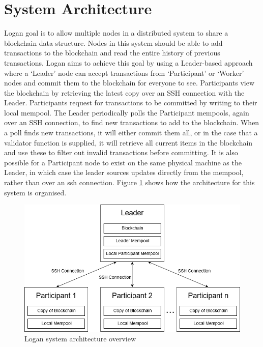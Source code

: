 \documentclass[12pt,a4paper,twoside,openright]{report}
\begin{document}
	\section{System Architecture}\label{sec:sysarch}
	Logan goal is to allow multiple nodes in a distributed system to share a blockchain data structure.
	Nodes in this system should be able to add transactions to the blockchain and read the entire history of previous transactions.
	Logan aims to achieve this goal by using a Leader-based approach where a `Leader' node can accept transactions from `Participant' or `Worker' nodes and commit them to the blockchain for everyone to see.
	Participants view the blockchain by retrieving the latest copy over an SSH connection with the Leader.
	Participants request for transactions to be committed by writing to their local mempool. 
	The Leader periodically polls the Participant mempools, again over an SSH connection, to find new transactions to add to the blockchain.
	When a poll finds new transactions, it will either commit them all, or in the case that a validator function is supplied, it will retrieve all current items in the blockchain and use these to filter out invalid transactions before committing.
	It is also possible for a Participant node to exist on the same physical machine as the Leader, in which case the leader sources updates directly from the mempool, rather than over an ssh connection. 
	Figure \ref{fig:sysarch} shows how the architecture for this system is organised.\\	

	\begin{figure}
		\centering
		\includegraphics[width=16cm]{figs/System_Architecture.png}
		\caption{Logan system architecture overview}
		\label{fig:sysarch}
	\end{figure}
\end{document}

